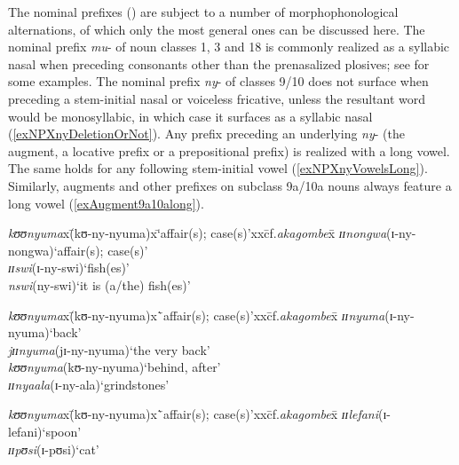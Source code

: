 The nominal prefixes () are subject to a number of morphophonological alternations, of which only the most general ones can be discussed here. The nominal prefix \mbox{\textit{mu}-} of noun classes 1, 3 and 18 is commonly realized as a syllabic nasal when preceding consonants other than the prenasalized plosives; see  for some examples. The nominal prefix \textit{ny}- of classes 9/10 does not surface when preceding a stem-initial nasal or voiceless fricative, unless the resultant word would be monosyllabic, in which case it surfaces as a syllabic nasal (\ref{exNPXnyDeletionOrNot}). Any prefix preceding an underlying \textit{ny}- (the augment, a locative prefix or a prepositional prefix) is realized with a long vowel. The same holds for any following stem-initial vowel (\ref{exNPXnyVowelsLong}). Similarly, augments and other prefixes on subclass 9a/10a nouns always feature a long vowel (\ref{exAugment9a10along}).

\begin{exe}
	\ex \label{exNPXnyDeletionOrNot}
	\begin{tabbing}
		\textit{kʊʊnyuma}x\=(\degree kʊ-ny-nyuma)x\=\lq affair(s); case(s)'xx\=cf.\textit{akagombe}x\=\kill%
		\textit{ɪɪnongwa}\>(\degree ɪ-ny-nongwa)\>\lq affair(s); case(s)'\\
		\textit{ɪɪswi}\>(\degree ɪ-ny-swi)\>`fish(es)'\\
		\textit{nswi}\>(\degree ny-swi)\>`it is (a/the) fish(es)'
	\end{tabbing}
	\ex \label{exNPXnyVowelsLong}
	\begin{tabbing}
		\textit{kʊʊnyuma}x\=(\degree kʊ-ny-nyuma)x\=`affair(s); case(s)'xx\=cf.\textit{akagombe}x\=\kill%
		\textit{ɪɪnyuma}\>(\degree ɪ-ny-nyuma)\>`back'\\
		\textit{jɪɪnyuma}\>(\degree jɪ-ny-nyuma)\>`the very back'\\
		\textit{kʊʊnyuma}\>(\degree kʊ-ny-nyuma)\>`behind, after'\\
		\textit{ɪɪnyaala}\>(\degree ɪ-ny-ala)\>`grindstones'
	\end{tabbing}
	\ex\label{exAugment9a10along}
	\begin{tabbing}
		\textit{kʊʊnyuma}x\=(\degree kʊ-ny-nyuma)x\=`affair(s); case(s)'xx\=cf.\textit{akagombe}x\=\kill
		\textit{ɪɪlefani}\>(\degree ɪ-lefani)\>`spoon'\\
		\textit{ɪɪpʊsi}\>(\degree ɪ-pʊsi)\>\lq cat'
	\end{tabbing}
\end{exe}

